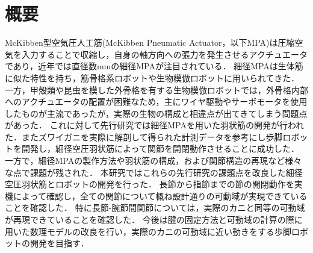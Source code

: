 \newpage
\section*{概要}
McKibben型空気圧人工筋(McKibben Pneumatic Actuator，以下MPA)は圧縮空気を入力することで収縮し，自身の軸方向への張力を発生させるアクチュエータであり，近年では直径数mmの細径MPAが注目されている．
細径MPAは生体筋に似た特性を持ち，筋骨格系ロボットや生物模倣ロボットに用いられてきた．
一方，甲殻類や昆虫を模した外骨格を有する生物模倣ロボットでは，外骨格内部へのアクチュエータの配置が困難なため，主にワイヤ駆動やサーボモータを使用したものが主流であったが，実際の生物の構成と相違点が出てきてしまう問題点があった．
これに対して先行研究では細径MPAを用いた羽状筋の開発が行われた．またズワイガニを実際に解剖して得られた計測データを参考にし歩脚ロボットを開発し，細径空圧羽状筋によって関節を開閉動作させることに成功した．
一方で，細径MPAの製作方法や羽状筋の構成，および関節構造の再現など様々な点で課題が残された．
本研究ではこれらの先行研究の課題点を改良した細径空圧羽状筋とロボットの開発を行った．
長節から指節までの節の開閉動作を実機によって確認し，全ての関節について概ね設計通りの可動域が実現できていることを確認した．
特に長節-腕節間関節については，実際のカニと同等の可動域が再現できていることを確認した．
今後は腱の固定方法と可動域の計算の際に用いた数理モデルの改良を行い，実際のカニの可動域に近い動きをする歩脚ロボットの開発を目指す．
